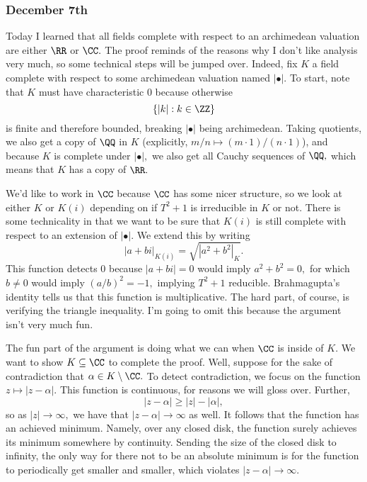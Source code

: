 \subsubsection{December 7th}
Today I learned that all fields complete with respect to an archimedean valuation are either $\RR$ or $\CC.$ The proof reminds of the reasons why I don't like analysis very much, so some technical steps will be jumped over. Indeed, fix $K$ a field complete with respect to some archimedean valuation named $|\bullet|.$ To start, note that $K$ must have characteristic $0$ because otherwise
\[\{|k|:k\in\ZZ\}\]
is finite and therefore bounded, breaking $|\bullet|$ being archimedean. Taking quotients, we also get a copy of $\QQ$ in $K$ (explicitly, $m/n\mapsto (m\cdot1)/(n\cdot1)$), and because $K$ is complete under $|\bullet|,$ we also get all Cauchy sequences of $\QQ,$ which means that $K$ has a copy of $\RR.$

We'd like to work in $\CC$ because $\CC$ has some nicer structure, so we look at either $K$ or $K(i)$ depending on if $T^2+1$ is irreducible in $K$ or not. There is some technicality in that we want to be sure that $K(i)$ is still complete with respect to an extension of $|\bullet|.$ We extend this by writing
\[|a+bi|_{K(i)}=\sqrt{\left|a^2+b^2\right|_K}.\]
This function detects $0$ because $|a+bi|=0$ would imply $a^2+b^2=0,$ for which $b\ne0$ would imply $(a/b)^2=-1,$ implying $T^2+1$ reducible. Brahmagupta's identity tells us that this function is multiplicative. The hard part, of course, is verifying the triangle inequality. I'm going to omit this because the argument isn't very much fun.

The fun part of the argument is doing what we can when $\CC$ is inside of $K.$ We want to show $K\subseteq\CC$ to complete the proof. Well, suppose for the sake of contradiction that $\alpha\in K\setminus\CC.$ To detect contradiction, we focus on the function $z\mapsto|z-\alpha|.$ This function is continuous, for reasons we will gloss over. Further,
\[|z-\alpha|\ge|z|-|\alpha|,\]
so as $|z|\to\infty,$ we have that $|z-\alpha|\to\infty$ as well. It follows that the function has an achieved minimum. Namely, over any closed disk, the function surely achieves its minimum somewhere by continuity. Sending the size of the closed disk to infinity, the only way for there not to be an absolute minimum is for the function to periodically get smaller and smaller, which violates $|z-\alpha|\to\infty.$

